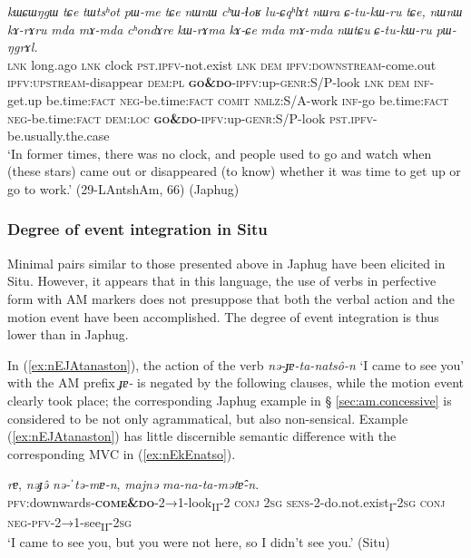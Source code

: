 \documentclass[oneside,a4paper,11pt]{article}
\newcommand{\ipa}[1]{{\phon\textit{#1}}}
\newcommand{\sens}[1]{‘#1’}
\newcommand{\rouge}[1]{\textbf{#1}}
\begin{document}
 \begin{exe}
\ex \label{ex:kWrAma.kACe}
\gll  \ipa{tɕe}	\ipa{kɯɕɯŋgɯ}	\ipa{tɕe}	\ipa{tɯtsʰot}	\ipa{pɯ-me}	\ipa{tɕe}	\ipa{nɯnɯ}	\ipa{cʰɯ-ɬoʁ}	\ipa{lu-ɕqʰlɤt}	\ipa{nɯra}	\ipa{ɕ-tu-kɯ-ru}	\ipa{tɕe,}	\ipa{nɯnɯ}	\ipa{kɤ-rɤru}	\ipa{mda}	\ipa{mɤ-mda}	\ipa{cʰondɤre}	\ipa{kɯ-rɤma}	\ipa{kɤ-ɕe}	\ipa{mda}	\ipa{mɤ-mda}	\ipa{nɯtɕu}	\ipa{ɕ-tu-kɯ-ru}	\ipa{pɯ-ŋgrɤl.} \\
 \textsc{lnk} long.ago \textsc{lnk} clock \textsc{pst}.\textsc{ipfv}-not.exist \textsc{lnk} \textsc{dem} \textsc{ipfv}:\textsc{downstream}-come.out \textsc{ipfv}:\textsc{upstream}-disappear \textsc{dem}:\textsc{pl} \rouge{\textsc{go\&do}}-\textsc{ipfv}:up-\textsc{genr}:S/P-look \textsc{lnk} \textsc{dem} \textsc{inf}-get.up be.time:\textsc{fact} \textsc{neg}-be.time:\textsc{fact} \textsc{comit} \textsc{nmlz}:S/A-work \textsc{inf}-go be.time:\textsc{fact} \textsc{neg}-be.time:\textsc{fact} \textsc{dem}:\textsc{loc} \rouge{\textsc{go\&do}}-\textsc{ipfv}:up-\textsc{genr}:S/P-look \textsc{pst}.\textsc{ipfv}-be.usually.the.case  \\
 \glt  `In former times, there was no clock, and people used to go and watch when (these stars) came out or disappeared (to know) whether it was time to get up or go to work.' (29-LAntshAm, 66) (Japhug)
  \end{exe}
  
\subsubsection{Degree of event integration in Situ} \label{sec:am.situ}
Minimal pairs similar to those presented above in Japhug have been elicited in Situ. However, it appears that in this language, the use of verbs in perfective form with AM markers does not presuppose that both the verbal action and the motion event have been accomplished. The degree of event integration is thus lower than in Japhug.


In (\ref{ex:nEJAtanaston}), the action of the verb \ipa{nə-ɟɐ-ta-natsô-n}  `I came to see you' with the AM prefix \ipa{ɟɐ-} is negated by the following clauses, while the motion event clearly took place; the corresponding Japhug example in § \ref{sec:am.concessive} is considered to be not only agrammatical, but also non-sensical. Example (\ref{ex:nEJAtanaston}) has little discernible semantic difference with the corresponding MVC in (\ref{ex:nEkEnatso}).
 

\begin{exe}
\ex \label{ex:nEJAtanaston}
\gll \ipa{nə-\rouge{ɟɐ}-ta-natsô-n} \ipa{rɐ}, \ipa{nəɟə̂} \ipa{nə-ˈtə-mɐ-n}, \ipa{majnə} \ipa{ma-na-ta-mətɐ̂-n}.\\
\textsc{pfv}:downwards-\textsc{\rouge{come\&do}}-2→1-look\textsubscript{II}-2 \textsc{conj} \textsc{2sg} \textsc{sens}-2-do.not.exist\textsubscript{I}-\textsc{2sg} \textsc{conj} \textsc{neg}-\textsc{pfv}-2→1-see\textsubscript{II}-\textsc{2sg}\\
\glt  \sens{I came to see you, but you were not here, so I didn't see you.} (Situ)
\end{exe}
\end{document}
